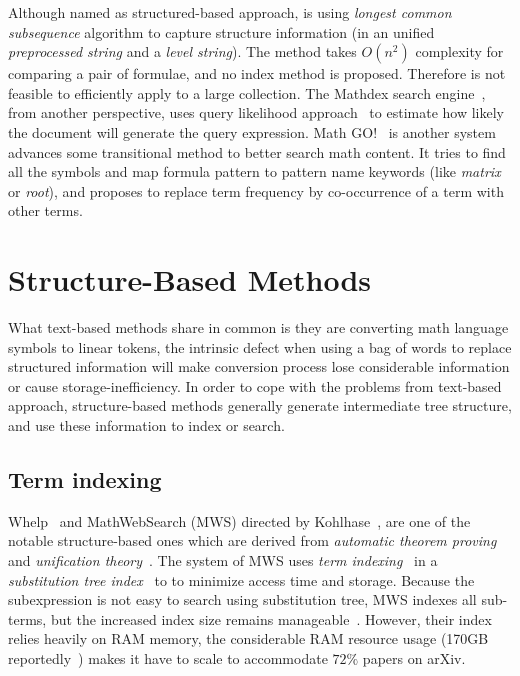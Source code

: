 Although named as structured-based approach, \cite{not-really-struct} is using \textit{longest common subsequence} algorithm to capture structure information (in an unified \textit{preprocessed string} and a \textit{level string}). The method takes $O(n^2)$ complexity for comparing a pair of formulae, and no index method is proposed. Therefore is not feasible to efficiently apply to a large collection.
The Mathdex search engine~\cite{queryf_datan07}, from another perspective, uses query likelihood approach~\cite{iir} to estimate how likely the document will generate the query expression.
Math GO!~\cite{Adeel_mathgo} is another system advances some transitional method to better search math content. It tries to find all the symbols and map formula pattern to pattern name keywords (like \textit{matrix} or \textit{root}), and proposes to replace term frequency by co-occurrence of a term with other terms.

\section{Structure-Based Methods}
\label{Structure-based}
What text-based methods share in common is they are converting math language symbols to linear tokens, the intrinsic defect when using a bag of words to replace structured information will make conversion process lose considerable information or cause storage-inefficiency.
In order to cope with the problems from text-based approach, structure-based methods generally generate intermediate tree structure, and use these information to index or search.

\subsection*{Term indexing}
Whelp~\cite{whelp04} and MathWebSearch (MWS) directed by Kohlhase~\cite{Kohlhase06,Kohlhase0p4,Kohlhase0p5}, are one of the notable structure-based ones which are derived from \textit{automatic theorem proving} and \textit{unification theory}~\cite{AIbook}. The system of MWS uses \textit{term indexing}~\cite{graf96} in a \textit{substitution tree index}~\cite{graf96} to to minimize access time and storage. Because the subexpression is not easy to search using substitution tree, MWS indexes all sub-terms, but the increased index size remains manageable~\cite{Kohlhase06}. However, their index relies heavily on RAM memory, 
the considerable RAM resource usage (170GB reportedly~\cite{Kohlhase0p5}) makes it have to scale to accommodate $72\%$ papers on arXiv. 

